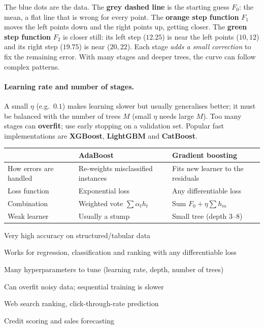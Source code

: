 \begin{explain}
The blue dots are the data. The \textbf{grey dashed line} is the starting guess $F_0$: the mean, a flat line that is wrong for every point. The \textbf{orange step function} $F_1$ moves the left points down and the right points up, getting closer. The \textbf{green step function} $F_2$ is closer still: its left step ($12.25$) is near the left points ($10,12$) and its right step ($19.75$) is near ($20,22$). Each stage \emph{adds a small correction} to fix the remaining error. With many stages and deeper trees, the curve can follow complex patterns.
\end{explain}

\paragraph{Learning rate and number of stages.} A small $\eta$ (e.g.\ $0.1$) makes learning slower but usually generalises better; it must be balanced with the number of trees $M$ (small $\eta$ needs large $M$). Too many stages can \textbf{overfit}; use early stopping on a validation set. Popular fast implementations are \textbf{XGBoost}, \textbf{LightGBM} and \textbf{CatBoost}.


\begin{center}
\small
\begin{tabular}{@{}p{3.1cm}p{5.5cm}p{5.5cm}@{}}
\toprule
 & \textbf{AdaBoost} & \textbf{Gradient boosting}\\
\midrule
How errors are handled & Re-weights misclassified instances & Fits new learner to the residuals\\
Loss function & Exponential loss & Any differentiable loss\\
Combination & Weighted vote $\sum\alpha_th_t$ & Sum $F_0+\eta\sum h_m$\\
Weak learner & Usually a stump & Small tree (depth 3--8)\\
\bottomrule
\end{tabular}
\end{center}

{\item Very high accuracy on structured/tabular data
 \item Works for regression, classification and ranking with any differentiable loss}
{\item Many hyperparameters to tune (learning rate, depth, number of trees)
 \item Can overfit noisy data; sequential training is slower}
{\item Web search ranking, click-through-rate prediction
 \item Credit scoring and sales forecasting}

